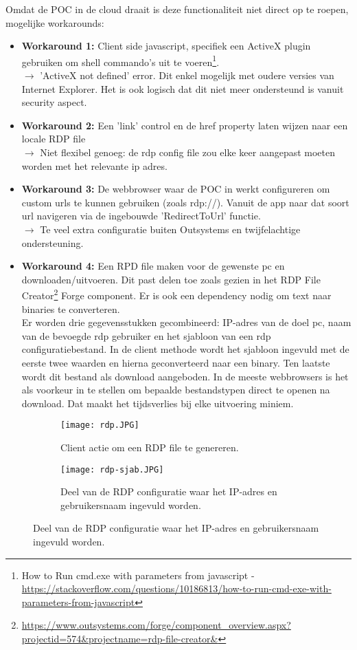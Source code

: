 Omdat de POC in de cloud draait is deze functionaliteit niet direct op te roepen, mogelijke workarounds:
\begin{itemize}
    \item \textbf{Workaround 1:} Client side javascript, specifiek een ActiveX plugin gebruiken om shell commando's uit te voeren\footnote{How to Run cmd.exe with parameters from javascript - \url{https://stackoverflow.com/questions/10186813/how-to-run-cmd-exe-with-parameters-from-javascript}}.\\
    $\rightarrow$ 'ActiveX not defined' error. Dit enkel mogelijk met oudere versies van Internet Explorer. Het is ook logisch dat dit niet meer ondersteund is vanuit security aspect.
    \item \textbf{Workaround 2:} Een 'link' control en de href property laten wijzen naar een locale RDP file\\
    $\rightarrow$ Niet flexibel genoeg: de rdp config file zou elke keer aangepast moeten worden met het relevante ip adres.
    \item \textbf{Workaround 3:} De webbrowser waar de POC in werkt configureren om custom urls te kunnen gebruiken (zoals rdp://). Vanuit de app naar dat soort url navigeren via de ingebouwde 'RedirectToUrl' functie.\\
    $\rightarrow$ Te veel extra configuratie buiten Outsystems en twijfelachtige ondersteuning.
    \item \textbf{Workaround 4:} Een RPD file maken voor de gewenste pc en downloaden/uitvoeren. Dit past delen toe zoals gezien in het RDP File Creator\footnote{\url{https://www.outsystems.com/forge/component_overview.aspx?projectid=574&projectname=rdp-file-creator&}} Forge component. Er is ook een dependency nodig om text naar binaries te converteren.\\
    Er worden drie gegevensstukken gecombineerd: IP-adres van de doel pc, naam van de bevoegde rdp gebruiker en het sjabloon van een rdp configuratiebestand. In de client methode wordt het sjabloon ingevuld met de eerste twee waarden en hierna geconverteerd naar een binary. Ten laatste wordt dit bestand als download aangeboden. In de meeste webbrowsers is het als voorkeur in te stellen om bepaalde bestandstypen direct te openen na download. Dat maakt het tijdsverlies bij elke uitvoering miniem.
\end{itemize}

\begin{figure}[h!]
    \begin{subfigure}[b]{0.8\linewidth}
        \texttt{[image: rdp.JPG]}
        \caption{Client actie om een RDP file te genereren.}
    \end{subfigure}
    \begin{subfigure}[b]{0.4\linewidth}
        \texttt{[image: rdp-sjab.JPG]}
        \caption{Deel van de RDP configuratie waar het IP-adres en gebruikersnaam ingevuld worden.}
    \end{subfigure}
    \label{fig:rdp-actie}
\end{figure}

